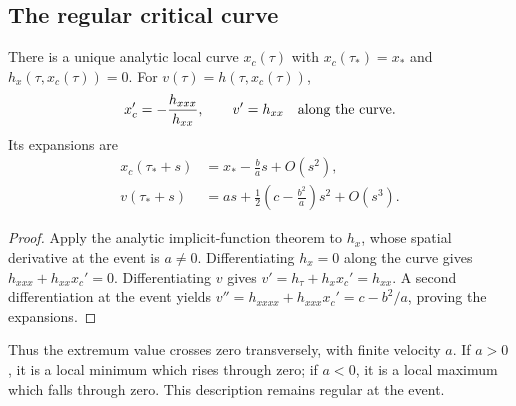 \subsection{The regular critical curve}
\begin{proposition}\label{prop:critical}
There is a unique analytic local curve \(x_c(\tau)\) with
\(x_c(\tau_*)=x_*\) and \(h_x(\tau,x_c(\tau))=0\).
For \(v(\tau)=h(\tau,x_c(\tau))\),
\begin{equation}\label{eq:critical-exact}
 x_c'=-\frac{h_{xxx}}{h_{xx}},\qquad v'=h_{xx}
 \quad\hbox{along the curve}.
\end{equation}
Its expansions are
\begin{align}
 x_c(\tau_*+s)&=x_*-\frac ba s+O(s^2),\label{eq:critical-place}\\
 v(\tau_*+s)&=as+\frac12\left(c-\frac{b^2}{a}\right)s^2+O(s^3).
 \label{eq:critical-value}
\end{align}
\end{proposition}
\begin{proof}
Apply the analytic implicit-function theorem to \(h_x\), whose spatial
derivative at the event is \(a\ne0\). Differentiating \(h_x=0\) along
the curve gives \(h_{xxx}+h_{xx}x_c'=0\). Differentiating \(v\) gives
\(v'=h_\tau+h_xx_c'=h_{xx}\). A second differentiation at the event
yields \(v''=h_{xxxx}+h_{xxx}x_c'=c-b^2/a\), proving the expansions.
\end{proof}

Thus the extremum value crosses zero transversely, with finite velocity
\(a\). If \(a>0\), it is a local minimum which rises through zero; if
\(a<0\), it is a local maximum which falls through zero. This description
remains regular at the event.

